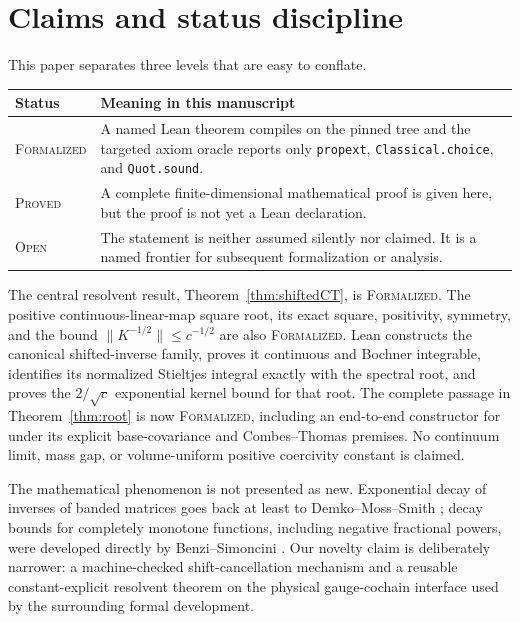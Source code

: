 \documentclass[11pt]{article}
\theoremstyle{definition}
\newcommand{\norm}[1]{\lVert #1\rVert}
\newcommand{\lean}[1]{\texttt{#1}}
\newcommand{\formalized}{\textsc{Formalized}}
\newcommand{\proved}{\textsc{Proved}}
\newcommand{\openstatus}{\textsc{Open}}
\begin{document}
\section{Claims and status discipline}\label{sec:claims}

This paper separates three levels that are easy to conflate.

\begin{center}
\begin{tabular}{p{}p{}}
\toprule
Status & Meaning in this manuscript \\
\midrule
\formalized & A named Lean theorem compiles on the pinned tree and the targeted
axiom oracle reports only \lean{propext}, \lean{Classical.choice}, and
\lean{Quot.sound}. \\
\proved & A complete finite-dimensional mathematical proof is given here, but
the proof is not yet a Lean declaration. \\
\openstatus & The statement is neither assumed silently nor claimed.  It is a
named frontier for subsequent formalization or analysis. \\
\bottomrule
\end{tabular}
\end{center}

The central resolvent result, Theorem~\ref{thm:shiftedCT}, is
\formalized.  The positive continuous-linear-map square root, its exact
square, positivity, symmetry, and the bound $\norm{K^{-1/2}}\le c^{-1/2}$ are
also \formalized.  Lean constructs the canonical shifted-inverse family,
proves it continuous and Bochner integrable, identifies its normalized
Stieltjes integral exactly with the spectral root, and proves the
$2/\sqrt c$ exponential kernel bound for that root.  The complete passage in
Theorem~\ref{thm:root} is now \formalized, including an end-to-end constructor
for  under its explicit
base-covariance and Combes--Thomas premises.  No continuum limit, mass gap, or
volume-uniform positive coercivity constant is claimed.

The mathematical phenomenon is not presented as new.  Exponential decay of
inverses of banded matrices goes back at least to Demko--Moss--Smith
\cite{DemkoMossSmith}; decay bounds for completely monotone functions,
including negative fractional powers, were developed directly by
Benzi--Simoncini \cite{BenziSimoncini}.  Our novelty claim is deliberately
narrower: a machine-checked shift-cancellation mechanism and a reusable
constant-explicit resolvent theorem on the physical gauge-cochain interface
used by the surrounding formal development.
\end{document}
